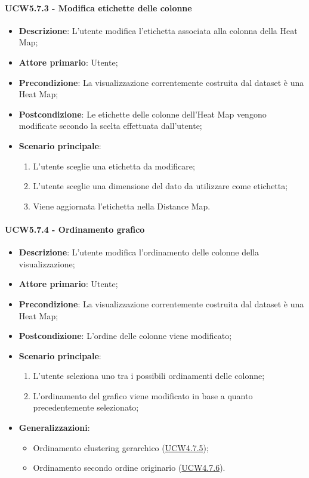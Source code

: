 \paragraph{UCW5.7.3 - Modifica etichette delle colonne}
\label{par:ucw5.7.3}
\begin{itemize}
    \item \textbf{Descrizione}:     L'utente modifica l'etichetta associata alla colonna della Heat Map;
    \item \textbf{Attore primario}: Utente;
    \item \textbf{Precondizione}:   La visualizzazione correntemente costruita dal dataset è una Heat Map;
    \item \textbf{Postcondizione}:  Le etichette delle colonne dell'Heat Map vengono modificate secondo la scelta effettuata dall'utente;
    \item \textbf{Scenario principale}:
    \begin{enumerate}
        \item L'utente sceglie una etichetta da modificare;
        \item L'utente sceglie una dimensione del dato da utilizzare come etichetta;
        \item Viene aggiornata l'etichetta nella Distance Map.
    \end{enumerate}
\end{itemize}

\paragraph{UCW5.7.4 - Ordinamento grafico}
\label{par:ucw5.7.4}
\begin{itemize}
    \item \textbf{Descrizione}:     L'utente modifica l'ordinamento delle colonne della visualizzazione;
    \item \textbf{Attore primario}: Utente;
    \item \textbf{Precondizione}:   La visualizzazione correntemente costruita dal dataset è una Heat Map;
    \item \textbf{Postcondizione}:  L'ordine delle colonne viene modificato;
    \item \textbf{Scenario principale}:
    \begin{enumerate}
        \item L'utente seleziona uno tra i possibili ordinamenti delle colonne;
        \item L'ordinamento del grafico viene modificato in base a quanto precedentemente selezionato;
    \end{enumerate}
    \item \textbf{Generalizzazioni}:
    \begin{itemize}
        \item Ordinamento clustering gerarchico (\hyperref[spar:ucw4.7.5]{UCW4.7.5});
        \item Ordinamento secondo ordine originario (\hyperref[spar:ucw4.7.6]{UCW4.7.6}).
    \end{itemize}
\end{itemize}

